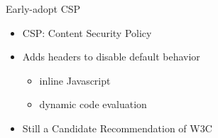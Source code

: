 \begin{frame}{Early-adopt CSP}
 \begin{itemize}[<+-| alert@+>]
  \item CSP: Content Security Policy
  \item Adds headers to disable default behavior
   \begin{itemize}[<+-| alert@+>]
     \item inline Javascript
     \item dynamic code evaluation
   \end{itemize}
  \item Still a Candidate Recommendation of W3C
 \end{itemize}
\end{frame}
